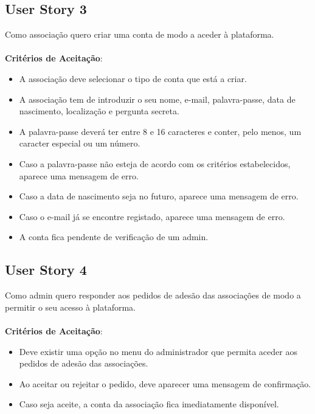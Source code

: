 \documentclass[a4paper,11pt]{article}
\begin{document}
\subsection{User Story 3}
Como associação quero criar uma conta de modo a aceder à plataforma.\\\\
\textbf{Critérios de Aceitação}:
\begin{itemize}
  \item A associação deve selecionar o tipo de conta que está a criar.
  \item A associação tem de introduzir o seu nome, e-mail, palavra-passe, data de nascimento, localização e pergunta secreta.
  \item A palavra-passe deverá ter entre 8 e 16 caracteres e conter, pelo menos, um caracter especial ou um número.
  \item Caso a palavra-passe não esteja de acordo com os critérios estabelecidos, aparece uma mensagem de erro.
  \item Caso a data de nascimento seja no futuro, aparece uma mensagem de erro.
  \item Caso o e-mail já se encontre registado, aparece uma mensagem de erro.
  \item A conta fica pendente de verificação de um admin.
\end{itemize}

\subsection{User Story 4}
Como admin quero responder aos pedidos de adesão das associações de modo a permitir o seu acesso à plataforma.\\\\
\textbf{Critérios de Aceitação}:
\begin{itemize}
  \item Deve existir uma opção no menu do administrador que permita aceder aos pedidos de adesão das associações.
  \item Ao aceitar ou rejeitar o pedido, deve aparecer uma mensagem de confirmação.
  \item Caso seja aceite, a conta da associação fica imediatamente disponível.
\end{itemize}
\end{document}
